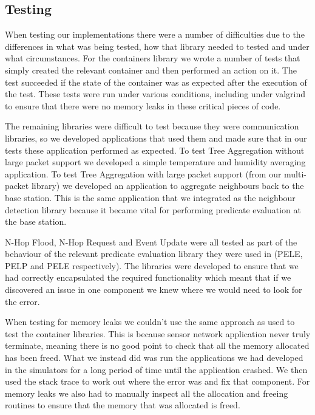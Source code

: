 \subsection{Testing}

When testing our implementations there were a number of difficulties due to the differences in what was being tested, how that library needed to tested and under what circumstances. For the containers library we wrote a number of tests that simply created the relevant container and then performed an action on it. The test succeeded if the state of the container was as expected after the execution of the test. These tests were run under various conditions, including under valgrind to ensure that there were no memory leaks in these critical pieces of code.

The remaining libraries were difficult to test because they were communication libraries, so we developed applications that used them and made sure that in our tests these application performed as expected. To test Tree Aggregation without large packet support we developed a simple temperature and humidity averaging application. To test Tree Aggregation with large packet support (from our multi-packet library) we developed an application to aggregate neighbours back to the base station. This is the same application that we integrated as the neighbour detection library because it became vital for performing predicate evaluation at the base station.

N-Hop Flood, N-Hop Request and Event Update were all tested as part of the behaviour of the relevant predicate evaluation library they were used in (PELE, PELP and PELE respectively). The libraries were developed to ensure that we had correctly encapsulated the required functionality which meant that if we discovered an issue in one component we knew where we would need to look for the error.

When testing for memory leaks we couldn't use the same approach as used to test the container libraries. This is because sensor network application never truly terminate, meaning there is no good point to check that all the memory allocated has been freed. What we instead did was run the applications we had developed in the simulators for a long period of time until the application crashed. We then used the stack trace to work out where the error was and fix that component. For memory leaks we also had to manually inspect all the allocation and freeing routines to ensure that the memory that was allocated is freed.

